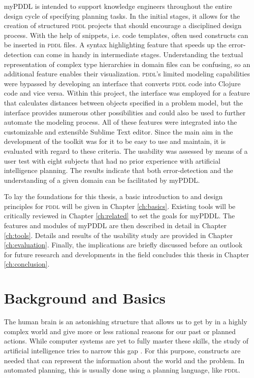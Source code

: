 \documentclass[a4paper,12pt]{report}
\newcommand{\mypddl}{\smallerft[0.8]{myPDDL}\xspace}
\newcommand{\pddl}{\textsc{pddl}\xspace}
\newcommand\smallerft[2][0.85]{{\scalefont{#1}#2}}
\begin{document}
\mypddl is intended to support knowledge engineers throughout the
entire design cycle of specifying planning tasks. In the initial
stages, it allows for the creation of structured \textsc{pddl}
projects that should encourage a disciplined design process. With the
help of snippets, i.e. code templates, often used constructs can be
inserted in \textsc{pddl} files. A syntax highlighting feature that
speeds up the error-detection can come in handy in intermediate
stages. Understanding the textual representation of complex type
hierarchies in domain files can be confusing, so an additional feature
enables their visualization. \textsc{pddl}'s limited modeling
capabilities were bypassed by developing an interface that converts
\textsc{pddl} code into Clojure \cite{hickey2008clojure} code and vice
versa. Within this project, the interface was employed for a feature
that calculates distances between objects specified in a problem
model, but the interface provides numerous other possibilities and
could also be used to further automate the modeling process. All of
these features were integrated into the customizable and extensible
Sublime Text \cite{sublimetext2} editor. Since the main aim in the
development of the toolkit was for it to be easy to use and maintain,
it is evaluated with regard to these criteria. The usability was
assessed by means of a user test with eight subjects that had no prior
experience with artificial intelligence planning. The results indicate
that both error-detection and the understanding of a given domain can
be facilitated by \mypddl.

To lay the foundations for this thesis, a basic introduction to and
design principles for \pddl will be given in Chapter \ref{ch:basics}.
Existing tools will be critically reviewed in Chapter \ref{ch:related} to
set the goals for \mypddl. The features and modules of \mypddl are then
described in detail in Chapter \ref{ch:tools}. Details and results of the
usability study are provided in Chapter \ref{ch:evaluation}. Finally, the
implications are briefly discussed before an outlook for future
research and developments in the field concludes this thesis in
Chapter \ref{ch:conclusion}.
\chapter{Background and Basics}
\label{sec-2}
\label{ch:basics}

The human brain is an astonishing structure that allows us to get by
in a highly complex world and give more or less rational reasons for
our past or planned actions. While computer systems are yet to fully
master these skills, the study of artificial intelligence tries to
narrow this gap \cite{akerkar2012intelligent}. For this purpose,
constructs are needed that can represent the information about the
world and the problem. In automated planning, this is usually done
\cite{fox2003pddl2} using a planning language, like \textsc{pddl}.
\end{document}
